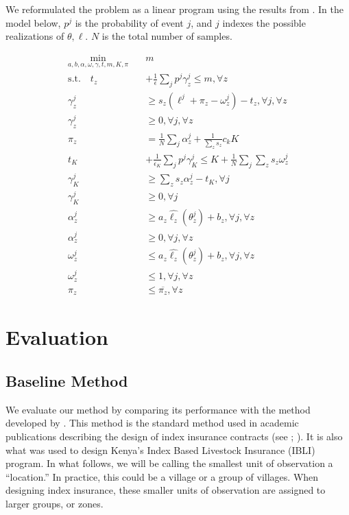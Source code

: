 \documentclass[11pt]{article}
\begin{document}
      We reformulated the problem as a linear program  using the results from \cite{rockafellar2000optimization}. In the model below, $p^j$ is the probability of event $j$, and $j$ indexes the possible realizations of $\theta, \ell$. $N$ is the total number of samples. 
  
      \begin{align}
        \min_{a,b,\alpha,\omega,\gamma,t,m,K,\pi} \quad & m\\
        \text{s.t.} \quad t_z &+ \frac{1}{\epsilon} \sum_j p^j \gamma_z^j \leq m, \forall z\\
        \gamma_z^j &\geq s_z \left (\ell^j + \pi_z - \omega^j_z \right ) -t_z, \forall j, \forall z \\
        \gamma_z^j &\geq 0, \forall j, \forall z\\
        \pi_z &= \frac{1}{N} \sum_j \alpha^j_z + \frac{1}{\sum_z s_z} c_k K\\
        t_K &+ \frac{1}{\epsilon_K} \sum_j p^j \gamma_K^j \leq K+ \frac{1}{N}\sum_j \sum_z s_z \omega^j_z\\
        \gamma_K^j &\geq \sum_z s_z \alpha^j_z -t_K, \forall j \\
        \gamma_K^j &\geq 0, \forall j\\
        \alpha^j_z &\geq a_z \hat{\ell_z}(\theta^j_z) + b_z, \forall j, \forall z\\
        \alpha^j_z &\geq 0, \forall j, \forall z\\
        \omega^j_z &\leq a_z \hat{\ell_z}(\theta^j_z) + b_z, \forall j, \forall z\\
        \omega^j_z &\leq 1, \forall j, \forall z\\
        \pi_z &\leq \overline{\pi_z}, \forall z
      \end{align}

\section{Evaluation}
  \subsection{Baseline Method}\label{baseline}
   We evaluate our method by comparing its performance with the method developed by \cite{chantarat2013designing}. This method is the standard method used in academic publications describing the design of index insurance contracts (see \cite{flatnes2018improving}; \cite{jensen2019does}). It is also what was used to design Kenya's Index Based Livestock Insurance (IBLI) program. In what follows, we will be calling the smallest unit of observation a ``location.'' In practice, this could be a village or a group of villages. When designing index insurance, these smaller units of observation are assigned to larger groups, or zones. 
\end{document}
